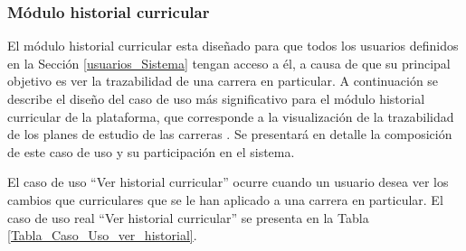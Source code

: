 	\subsubsection{Módulo historial curricular}
	
	El módulo historial curricular esta diseñado para que todos los usuarios definidos en la Sección \ref{usuarios_Sistema} tengan acceso a él, a causa de que su principal objetivo es ver la trazabilidad de una carrera en particular.
	A continuación se describe el diseño del caso de uso más significativo para el módulo  historial curricular de la plataforma, que corresponde a la visualización de la trazabilidad de los planes de estudio de las carreras . Se presentará en detalle la composición de este caso de uso y su participación en el sistema.
		
	
	El caso de uso “Ver historial curricular” ocurre cuando un usuario  desea  ver los cambios que curriculares que se le han aplicado a una carrera en particular. El caso de uso real “Ver historial curricular” se presenta en la Tabla \ref{Tabla_Caso_Uso_ver_historial}.
	
